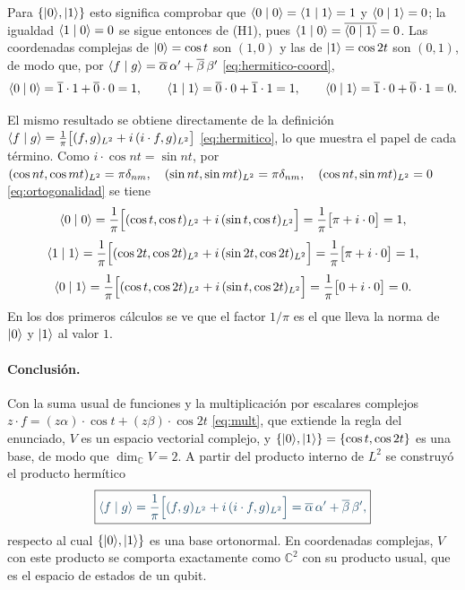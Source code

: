 Para $\{\lvert 0\rangle,\lvert 1\rangle\}$ esto significa comprobar que $\langle 0\mid 0\rangle=\langle 1\mid 1\rangle=1$ y $\langle 0\mid 1\rangle=0$; la igualdad
$\langle 1\mid 0\rangle=0$ se sigue entonces de (H1), pues $\langle 1\mid 0\rangle=\overline{\langle 0\mid 1\rangle}=0$. Las coordenadas complejas
de $\lvert 0\rangle=\cos t$ son $(1,0)$ y las de $\lvert 1\rangle=\cos 2t$ son $(0,1)$, de modo que, por
$\langle f\mid g\rangle=\overline\alpha\,\alpha'+\overline\beta\,\beta'$ \eqref{eq:hermitico-coord},
\[
  \langle 0\mid 0\rangle=\overline1\cdot1+\overline0\cdot0=1,\qquad
  \langle 1\mid 1\rangle=\overline0\cdot0+\overline1\cdot1=1,\qquad
  \langle 0\mid 1\rangle=\overline1\cdot0+\overline0\cdot1=0 .
\]

El mismo resultado se obtiene directamente de la definición $\langle f\mid g\rangle=\frac1\pi\bigl[(f,g)_{L^2}+i\,(i\cdot f,g)_{L^2}\bigr]$ \eqref{eq:hermitico}, lo que
muestra el papel de cada término. Como $i\cdot\cos nt=\sin nt$, por $(\cos nt,\cos mt)_{L^2}=\pi\delta_{nm},\quad\penalty0 (\sin nt,\sin mt)_{L^2}=\pi\delta_{nm},\quad\penalty0 (\cos nt,\sin mt)_{L^2}=0$ \eqref{eq:ortogonalidad}
se tiene
\[
  \langle 0\mid 0\rangle=\frac1\pi\Bigl[(\cos t,\cos t)_{L^2}+i\,(\sin t,\cos t)_{L^2}\Bigr]
  =\frac1\pi\bigl[\pi+i\cdot0\bigr]=1,
\]
\[
  \langle 1\mid 1\rangle=\frac1\pi\Bigl[(\cos 2t,\cos 2t)_{L^2}+i\,(\sin 2t,\cos 2t)_{L^2}\Bigr]
  =\frac1\pi\bigl[\pi+i\cdot0\bigr]=1,
\]
\[
  \langle 0\mid 1\rangle=\frac1\pi\Bigl[(\cos t,\cos 2t)_{L^2}+i\,(\sin t,\cos 2t)_{L^2}\Bigr]
  =\frac1\pi\bigl[0+i\cdot0\bigr]=0 .
\]
En los dos primeros cálculos se ve que el factor $1/\pi$ es el que lleva la norma de $\lvert 0\rangle$ y
$\lvert 1\rangle$ al valor $1$.

\paragraph{Conclusión.}
Con la suma usual de funciones y la multiplicación por escalares complejos
$z\cdot f=(z\alpha)\cdot\cos t+(z\beta)\cdot\cos 2t$ \eqref{eq:mult}, que extiende la regla del enunciado, $V$ es un espacio vectorial complejo, y
$\{\lvert 0\rangle,\lvert 1\rangle\}=\{\cos t,\cos 2t\}$ es una base, de modo que $\dim_{\mathbb C}V=2$. A partir del
producto interno de $L^2$ se construyó el producto hermítico
\[
  \destacado{\bk fg=\frac1\pi\Bigl[\Lp fg+i\,\Lp{i\cdot f}{g}\Bigr]
  =\overline\alpha\,\alpha'+\overline\beta\,\beta' ,}
\]
respecto al cual $\{\lvert 0\rangle,\lvert 1\rangle\}$ es una base ortonormal. En coordenadas complejas, $V$ con
este producto se comporta exactamente como $\mathbb C^2$ con su producto usual, que es el
espacio de estados de un qubit.
